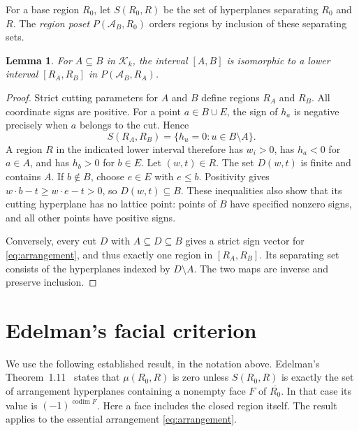 \documentclass[11pt]{article}
\newtheorem{lemma}[theorem]{Lemma}
\theoremstyle{remark}
\newcommand{\K}{\mathcal K}
\newcommand{\A}{\mathcal A}
\newcommand{\codim}{\operatorname{codim}}
\begin{document}
For a base region $R_0$, let $S(R_0,R)$ be the set of hyperplanes separating
$R_0$ and $R$. The \emph{region poset} $P(\A_B,R_0)$ orders regions by
inclusion of these separating sets.

\begin{lemma}\label{lem:interval}
For $A\subseteq B$ in $\K_k$, the interval $[A,B]$ is isomorphic to a lower
interval $[R_A,R_B]$ in $P(\A_B,R_A)$.
\end{lemma}

\begin{proof}
Strict cutting parameters for $A$ and $B$ define regions $R_A$ and $R_B$.
All coordinate signs are positive. For a point $a\in B\cup E$, the sign
of $h_a$ is negative precisely when $a$ belongs to the cut. Hence
\[
 S(R_A,R_B)=\{h_u=0:u\in B\setminus A\}.
\]
A region $R$ in the indicated lower interval therefore has $w_i>0$, has
$h_a<0$ for $a\in A$, and has $h_b>0$ for $b\in E$. Let $(w,t)\in R$.
The set $D(w,t)$ is finite and contains $A$. If $b\notin B$, choose
$e\in E$ with $e\leq b$. Positivity gives
$w\cdot b-t\geq w\cdot e-t>0$, so $D(w,t)\subseteq B$.
These inequalities also show that its cutting hyperplane has no lattice
point: points of $B$ have specified nonzero signs, and all other points
have positive signs.

Conversely, every cut $D$ with $A\subseteq D\subseteq B$ gives a strict
sign vector for \eqref{eq:arrangement}, and thus exactly one region in
$[R_A,R_B]$. Its separating set consists of the hyperplanes indexed by
$D\setminus A$. The two maps are inverse and preserve inclusion.
\end{proof}

\section{Edelman's facial criterion}

We use the following established result, in the notation above.
Edelman's Theorem~1.11~\cite{Edelman} states that $\mu(R_0,R)$ is zero
unless $S(R_0,R)$ is exactly the set of arrangement hyperplanes containing
a nonempty face $F$ of $\overline{R_0}$. In that case its value is
$(-1)^{\codim F}$. Here a face includes the closed region itself.
The result applies to the essential arrangement \eqref{eq:arrangement}.
\end{document}
